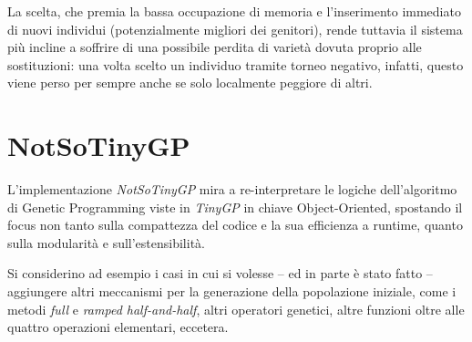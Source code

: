 \documentclass{../llncs}
\begin{document}
La scelta, che premia la bassa occupazione di memoria e l'inserimento immediato di nuovi individui (potenzialmente migliori dei genitori), rende tuttavia il sistema più incline a soffrire di una possibile perdita di varietà dovuta proprio alle sostituzioni: una volta scelto un individuo tramite torneo negativo, infatti, questo viene perso per sempre anche se solo localmente peggiore di altri.

%

\section{NotSoTinyGP}
L'implementazione \emph{NotSoTinyGP} mira a re-interpretare le logiche dell'algoritmo di Genetic Programming viste in \emph{TinyGP} in chiave Object-Oriented, spostando il focus non tanto sulla compattezza del codice e la sua efficienza a runtime, quanto sulla modularità e sull'estensibilità.

Si considerino ad esempio i casi in cui si volesse -- ed in parte è stato fatto -- aggiungere altri meccanismi per la generazione della popolazione iniziale, come i metodi \emph{full} e \emph{ramped half-and-half}, altri operatori genetici, altre funzioni oltre alle quattro operazioni elementari, eccetera.\\
\end{document}

